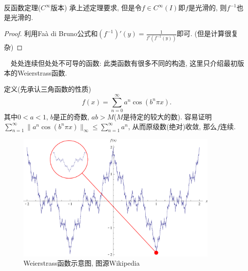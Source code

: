 \begin{corollary}{反函数定理($C^{\infty}$版本)}
	承上述定理要求, 但是令$f \in C^{\infty}(I)$即$f$是光滑的, 则$f^{-1}$也是光滑的. 
\end{corollary}
\begin{proof}
	利用Faà di Bruno公式和$(f^{-1})'(y)=\frac{1}{f'(f^{-1}(y))}$即可. (但是计算很复杂)
\end{proof}

~~处处连续但处处不可导的函数: 此类函数有很多不同的构造, 这里只介绍最初版本的Weierstrass函数. 

定义(先承认三角函数的性质)$$f(x)=\sum_{n=0}^{\infty} a^n\cos (b^n\pi x). $$
其中$0<a<1$, $b$是正的奇数, $ab>M$($M$是待定的较大的数). 容易证明$\sum_{n=1}^{\infty} \| a^n\cos (b^n\pi x) \|_{\infty} \leq \sum_{n=1}^{\infty}a^n$, 从而原级数(绝对)收敛, 那么$f$连续. 

\begin{figure}[H]
	\centering
	\includegraphics[width=10cm]{attachment/WeierstrassFunction.pdf}
	\caption{Weierstrass函数示意图, 图源Wikipedia}
\end{figure}

